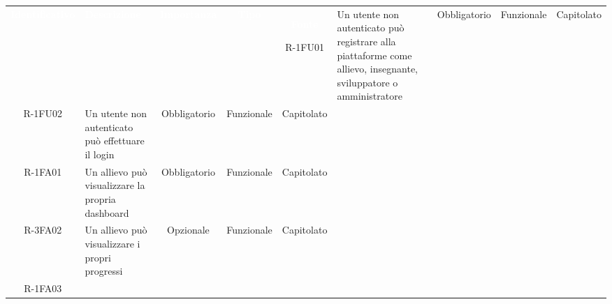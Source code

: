  
\renewcommand{\arraystretch}{1.5}
\def\tabularxcolumn#1{m{#1}}
\begin{tabularx}{\textwidth}{cXccc}
 
   \textcolor{white}{\textbf{Identificativo}} &
   \textcolor{white}{\textbf{Descrizione}}&
   \textcolor{white}{\textbf{Importanza}}&
   \textcolor{white}{\textbf{Tipo}}&
   \textcolor{white}{\textbf{Fonte}}\endhead
 
R-1FU01 &
 
Un utente non autenticato può registrare alla piattaforme come allievo, insegnante, sviluppatore o amministratore &
 
Obbligatorio &
 
Funzionale &
 
Capitolato \\

R-1FU02 &

Un utente non autenticato può effettuare il login &

Obbligatorio &

Funzionale &

Capitolato \\
R-1FA01 &

Un allievo può visualizzare la propria dashboard &

Obbligatorio &

Funzionale &

Capitolato \\
R-3FA02 &


Un allievo può visualizzare i propri progressi &

Opzionale &

Funzionale &

Capitolato \\
R-1FA03 &


\end{tabularx}
